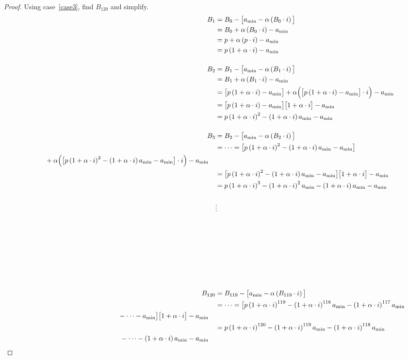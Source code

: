 \documentclass[12pt,letterpaper,oneside]{article}
\theoremstyle{remark} %
\begin{document}
\begin{proof}
	Using case~\ref{case3}, find $B_{120}$ and simplify.
	\begin{align*}
	B_{1}&=B_{0}-\big[a_{\rm{min}}-\alpha\left(B_{0}\cdot i\right)\big]\\
	&=B_{0}+\alpha\left(B_{0}\cdot i\right)-a_{\rm{min}}\\
	&=p+\alpha\left(p\cdot i\right)-a_{\rm{min}}\\
	&=p\left(1+\alpha\cdot i\right)-a_{\rm{min}}\\[12pt]
	B_{2}&=B_{1}-\big[a_{\rm{min}}-\alpha\left(B_{1}\cdot i\right)\big]\\
	&=B_{1}+\alpha\left(B_{1}\cdot i\right)-a_{\rm{min}}\\
	&=\big[\bo\big]+\alpha\Big(\big[\bo\big]\cdot i\Big)-a_{\rm{min}}\\
	&=\big[\bo\big]\big[1+\alpha\cdot i\big]-a_{\rm{min}}\\
	&=p\left(1+\alpha\cdot i\right)^{2}-\left(1+\alpha\cdot i\right)a_{\rm{min}}-a_{\rm{min}}\\[12pt]
	B_{3}&=B_{2}-\big[a_{\rm{min}}-\alpha\left(B_{2}\cdot i\right)\big]\\
	&=\dots=\big[\bt\big]\\
	\begin{split} %
	&\qquad\quad\;\:\,+\alpha\Big(\big[\bt\big]\cdot i\Big)-a_{\rm{min}}
	\end{split}\\
	&=\big[\bt\big]\big[1+\alpha\cdot i\big]-a_{\rm{min}}\\
	&=p\left(1+\alpha\cdot i\right)^{3}-\left(1+\alpha\cdot i\right)^{2}a_{\rm{min}}
	-\left(1+\alpha\cdot i\right)a_{\rm{min}}-a_{\rm{min}}\\[12pt] %
	&\vdots\\[108pt] %
	B_{120}&=B_{119}-\big[a_{\rm{min}}-\alpha\left(B_{119}\cdot i\right)\big]\\
	&=\dots=\big[p\base^{119}-\base^{118}a_{\rm{min}}-\base^{117}a_{\rm{min}}\\
	\begin{split}
	&\qquad\quad\;\:\,-\dots-a_{\rm{min}}\big]\big[1+\alpha\cdot i\big]-a_{\rm{min}}
	\end{split}\\
	&=p\base^{120}-\base^{119}a_{\rm{min}}-\base^{118}a_{\rm{min}}\\
	\begin{split}
	&\quad-\dots-\base a_{\rm{min}}-a_{\rm{min}}
	\end{split}\\

\end{align*}
\end{proof}
\end{document}
